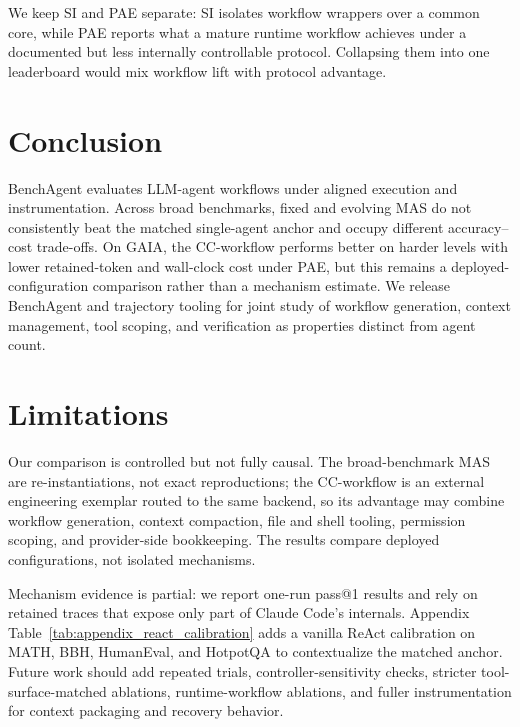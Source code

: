 We keep SI and PAE separate: SI isolates workflow wrappers over a common core, while PAE reports what a mature runtime workflow achieves under a documented but less internally controllable protocol. Collapsing them into one leaderboard would mix workflow lift with protocol advantage.

\section{Conclusion}
BenchAgent evaluates LLM-agent workflows under aligned execution and instrumentation. Across broad benchmarks, fixed and evolving MAS do not consistently beat the matched single-agent anchor and occupy different accuracy--cost trade-offs. On GAIA, the CC-workflow performs better on harder levels with lower retained-token and wall-clock cost under PAE, but this remains a deployed-configuration comparison rather than a mechanism estimate. We release BenchAgent and trajectory tooling for joint study of workflow generation, context management, tool scoping, and verification as properties distinct from agent count.

\section{Limitations}
Our comparison is controlled but not fully causal. The broad-benchmark MAS are re-instantiations, not exact reproductions; the CC-workflow is an external engineering exemplar routed to the same backend, so its advantage may combine workflow generation, context compaction, file and shell tooling, permission scoping, and provider-side bookkeeping. The results compare deployed configurations, not isolated mechanisms.

Mechanism evidence is partial: we report one-run pass@1 results and rely on retained traces that expose only part of Claude Code's internals. Appendix Table~\ref{tab:appendix_react_calibration} adds a vanilla ReAct calibration on MATH, BBH, HumanEval, and HotpotQA to contextualize the matched anchor. Future work should add repeated trials, controller-sensitivity checks, stricter tool-surface-matched ablations, runtime-workflow ablations, and fuller instrumentation for context packaging and recovery behavior.
